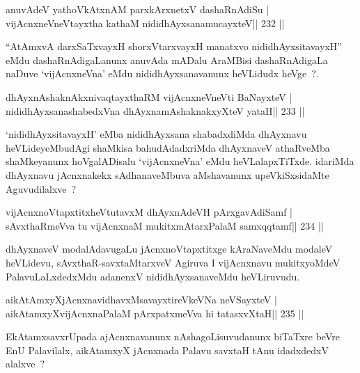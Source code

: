 
\begin{shl}
anuvAdeV yathoVkAtxnAM parxkArxnetxV dashaRnAdiSu |
vijAcnxneVneVtayxtha kathaM nididhAyxsanamucayxteV\hfill || 232 ||
\end{shl}

\begin{artha}
``AtAmxvA darxSaTxvayxH shorxVtarxvayxH manatxvo nididhAyxsitavayxH'' eMdu dashaRnAdigaLanunx anuvAda mADalu AraMBisi dashaRnAdigaLa naDuve `vijAcnxneVna' eMdu nididhAyxsanavanunx heVLidudx heVge~?.
\end{artha}


\begin{shl}
dhAyxnAshaknAkxnivaqtayxthaRM vijAcnxneVneVti BaNayxteV |
nididhAyxsanashabedxVna dhAyxnamAshaknakxyXteV yataH\hfill || 233 ||
\end{shl}

\begin{artha}
`nididhAyxsitavayxH' eMba nididhAyxsana shabadxdiMda dhAyxnavu heVLideyeMbudAgi shaMkisa bahudAdadxriMda dhAyxnaveV athaRveMba shaMkeyanunx hoVgalADisalu `vijAcnxneVna' eMdu heVLalapxTiTxde. idariMda dhAyxnavu jAcnxnakekx sAdhanaveMbuva aMshavanunx upeVkiSxsidaMte Aguvudilalxve~? 
\end{artha}


\begin{shl}
vijAcnxnoVtapxtitxheVtutavxM dhAyxnAdeVH pArxgavAdiSamf |
sAvxthaRmeVva tu vijAcnxnaM mukitxmAtarxPalaM samxqqtamf\hfill || 234 ||
\end{shl}

\begin{artha}
dhAyxnaveV modalAdavugaLu jAcnxnoVtapxtitxge kAraNaveMdu modaleV heVLidevu, sAvxthaR-savxtaMtarxveV Agiruva I vijAcnxnavu mukitxyoMdeV PalavuLaLxdedxMdu adanenxV nididhAyxsanaveMdu heVLiruvudu.
\end{artha}


\begin{shl}
aikAtAmxyXjAcnxnavidhavxMsavayxtireVkeVNa neVSayxteV |
aikAtamxyXvijAcnxnaPalaM pArxpatxmeVva hi tatasxvXtaH\hfill || 235 ||
\end{shl}

\begin{artha}
EkAtamxsavxrUpada ajAcnxnavanunx nAshagoLisuvudanunx biTaTxre beVre EnU Palavilalx, aikAtamxyX jAcnxnada Palavu savxtaH tAnu idadxdedxV alalxve~?
\end{artha}

